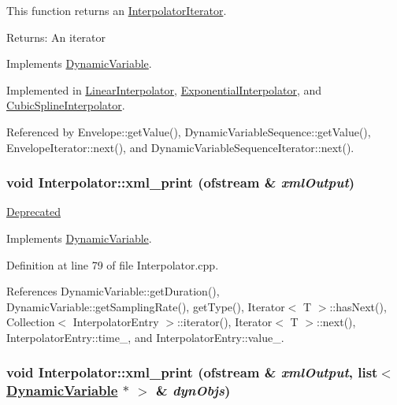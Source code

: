 This function returns an \hyperlink{classInterpolatorIterator}{Interpolator\-Iterator}. \begin{Desc}
\item[Returns:]An iterator \end{Desc}


Implements \hyperlink{classDynamicVariable_a3}{Dynamic\-Variable}.

Implemented in \hyperlink{classLinearInterpolator_a2}{Linear\-Interpolator}, \hyperlink{classExponentialInterpolator_a2}{Exponential\-Interpolator}, and \hyperlink{classCubicSplineInterpolator_a2}{Cubic\-Spline\-Interpolator}.

Referenced by Envelope::get\-Value(), Dynamic\-Variable\-Sequence::get\-Value(), Envelope\-Iterator::next(), and Dynamic\-Variable\-Sequence\-Iterator::next().\hypertarget{classInterpolator_a8}{
\subsubsection[xml\_\-print]{\setlength{\rightskip}{0pt plus 5cm}void Interpolator::xml\_\-print (ofstream \& {\em xml\-Output})}}
\label{classInterpolator_a8}


\begin{Desc}
\item[\hyperlink{deprecated__deprecated000017}{Deprecated}]\end{Desc}


Implements \hyperlink{classDynamicVariable_a12}{Dynamic\-Variable}.

Definition at line 79 of file Interpolator.cpp.

References Dynamic\-Variable::get\-Duration(), Dynamic\-Variable::get\-Sampling\-Rate(), get\-Type(), Iterator$<$ T $>$::has\-Next(), Collection$<$ Interpolator\-Entry $>$::iterator(), Iterator$<$ T $>$::next(), Interpolator\-Entry::time\_\-, and Interpolator\-Entry::value\_\-.\hypertarget{classInterpolator_a7}{
\subsubsection[xml\_\-print]{\setlength{\rightskip}{0pt plus 5cm}void Interpolator::xml\_\-print (ofstream \& {\em xml\-Output}, list$<$ \hyperlink{classDynamicVariable}{Dynamic\-Variable} $\ast$ $>$ \& {\em dyn\-Objs})}}
\label{classInterpolator_a7}


